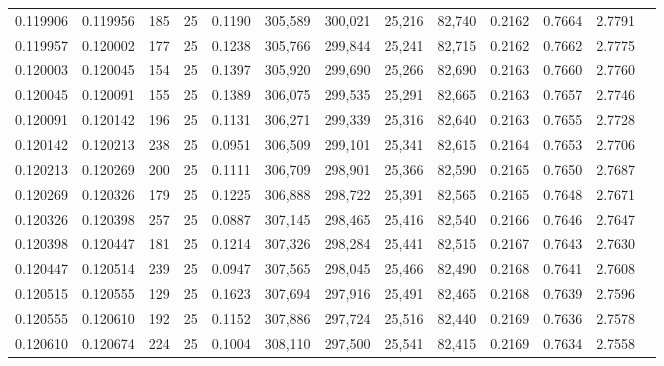 \begin{tabular}{rrrrrrrrrrrrr}
0.119906 & 0.119956 &   185 &  25 &                                     0.1190 & 305,589 & 300,021 &  25,216 &  82,740 & 0.2162 & 0.7664 & 2.7791 \\
0.119957 & 0.120002 &   177 &  25 &                                     0.1238 & 305,766 & 299,844 &  25,241 &  82,715 & 0.2162 & 0.7662 & 2.7775 \\
0.120003 & 0.120045 &   154 &  25 &                                     0.1397 & 305,920 & 299,690 &  25,266 &  82,690 & 0.2163 & 0.7660 & 2.7760 \\
0.120045 & 0.120091 &   155 &  25 &                                     0.1389 & 306,075 & 299,535 &  25,291 &  82,665 & 0.2163 & 0.7657 & 2.7746 \\
0.120091 & 0.120142 &   196 &  25 &                                     0.1131 & 306,271 & 299,339 &  25,316 &  82,640 & 0.2163 & 0.7655 & 2.7728 \\
0.120142 & 0.120213 &   238 &  25 &                                     0.0951 & 306,509 & 299,101 &  25,341 &  82,615 & 0.2164 & 0.7653 & 2.7706 \\
0.120213 & 0.120269 &   200 &  25 &                                     0.1111 & 306,709 & 298,901 &  25,366 &  82,590 & 0.2165 & 0.7650 & 2.7687 \\
0.120269 & 0.120326 &   179 &  25 &                                     0.1225 & 306,888 & 298,722 &  25,391 &  82,565 & 0.2165 & 0.7648 & 2.7671 \\
0.120326 & 0.120398 &   257 &  25 &                                     0.0887 & 307,145 & 298,465 &  25,416 &  82,540 & 0.2166 & 0.7646 & 2.7647 \\
0.120398 & 0.120447 &   181 &  25 &                                     0.1214 & 307,326 & 298,284 &  25,441 &  82,515 & 0.2167 & 0.7643 & 2.7630 \\
0.120447 & 0.120514 &   239 &  25 &                                     0.0947 & 307,565 & 298,045 &  25,466 &  82,490 & 0.2168 & 0.7641 & 2.7608 \\
0.120515 & 0.120555 &   129 &  25 &                                     0.1623 & 307,694 & 297,916 &  25,491 &  82,465 & 0.2168 & 0.7639 & 2.7596 \\
0.120555 & 0.120610 &   192 &  25 &                                     0.1152 & 307,886 & 297,724 &  25,516 &  82,440 & 0.2169 & 0.7636 & 2.7578 \\
0.120610 & 0.120674 &   224 &  25 &                                     0.1004 & 308,110 & 297,500 &  25,541 &  82,415 & 0.2169 & 0.7634 & 2.7558 \\

\end{tabular}
